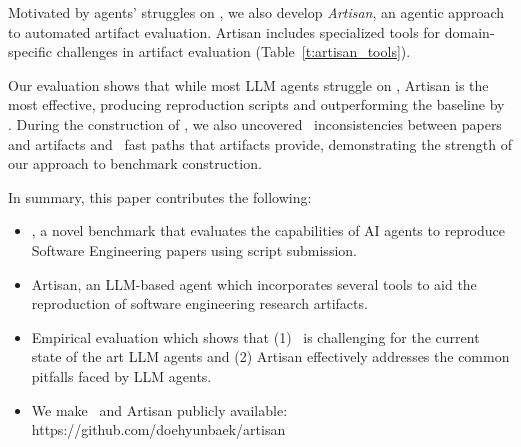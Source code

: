 Motivated by agents’ struggles on \benchmark, we also develop \emph{Artisan}, an agentic approach to automated artifact evaluation.
Artisan includes specialized tools for domain-specific challenges in artifact evaluation (Table~\ref{t:artisan_tools}).

Our evaluation shows that while most LLM agents struggle on \benchmark, Artisan is the most effective, producing \artisanpartial{} reproduction scripts and outperforming the baseline by \artisanpartialoutperform{}.
During the construction of \benchmark, we also uncovered \inconsistenciessize~inconsistencies between papers and artifacts and \fastpathsize~fast paths that artifacts provide, demonstrating the strength of our approach to benchmark construction.

In summary, this paper contributes the following:
\begin{itemize}
    \item \benchmark, a novel benchmark that evaluates the capabilities of AI agents to reproduce Software Engineering papers using script submission.
    \item Artisan, an LLM-based agent which incorporates several tools to aid the reproduction of software engineering research artifacts.
    \item Empirical evaluation which shows that (1) \benchmark~is challenging for the current state of the art LLM agents and (2) Artisan effectively addresses the common pitfalls faced by LLM agents.
    \item We make \benchmark~and Artisan publicly available: https://github.com/doehyunbaek/artisan
\end{itemize}
